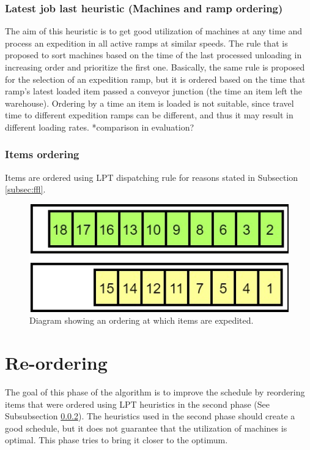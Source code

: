 \documentclass{ctuthesis}
\begin{document}
\subsubsection{Latest job last heuristic (Machines and ramp ordering)}

The aim of this heuristic is to get good utilization of machines at any time and process an expedition in all active ramps at similar speeds. The rule that is proposed to sort machines based on the time of the last processed unloading in increasing order and prioritize the first one. 
Basically, the same rule is proposed for the selection of an expedition ramp, but it is ordered based on the time that ramp's latest loaded item passed a conveyor junction (the time an item left the warehouse). Ordering by a time an item is loaded is not suitable, since travel time to different expedition ramps can be different, and thus it may result in different loading rates. *comparison in evaluation?

\subsubsection{Items ordering}
\label{subsubsec:itemsordering}

Items are ordered using LPT dispatching rule for reasons stated in Subsection \ref{subsec:ffl}.


\begin{figure}[h]
\includegraphics[width=1\linewidth]{order.jpg}
\caption{Diagram showing an ordering at which items are expedited.}
\label{order}
\end{figure}

\section{Re-ordering}

The goal of this phase of the algorithm is to improve the schedule by reordering items that were ordered using LPT heuristics in the second phase (See Subsubsection \ref{subsubsec:itemsordering}). The heuristics used in the second phase should create a good schedule, but it does not guarantee that the utilization of machines is optimal. This phase tries to bring it closer to the optimum.
\end{document}
